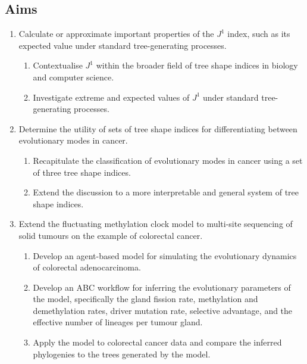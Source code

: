 \subsection{Aims}
\begin{enumerate}
    \item Calculate or approximate important properties of the $J^1$ index,
        such as its expected value under standard tree-generating processes.
        \begin{enumerate}
            \item Contextualise $J^1$ within the broader field of tree shape
                indices in biology and computer science.
            \item Investigate extreme and expected values of $J^1$ under
                standard tree-generating processes.
        \end{enumerate}
    \item Determine the utility of sets of tree shape indices for
        differentiating between evolutionary modes in cancer.
        \begin{enumerate}
            \item Recapitulate the classification of evolutionary modes in
                cancer using a set of three tree shape indices.
            \item Extend the discussion to a more interpretable and general
                system of tree shape indices.
        \end{enumerate}
    \item Extend the fluctuating methylation clock model to multi-site
        sequencing of solid tumours on the example of colorectal cancer.
        \begin{enumerate}
            \item Develop an agent-based model for simulating the evolutionary
                dynamics of colorectal adenocarcinoma.
            \item Develop an ABC workflow for inferring the evolutionary
                parameters of the model, specifically the gland fission rate,
                methylation and demethylation rates, driver mutation rate,
                selective advantage, and the effective number of lineages per
                tumour gland.
            \item Apply the model to colorectal cancer data and compare the
                inferred phylogenies to the trees generated by the model.
        \end{enumerate}
\end{enumerate}
